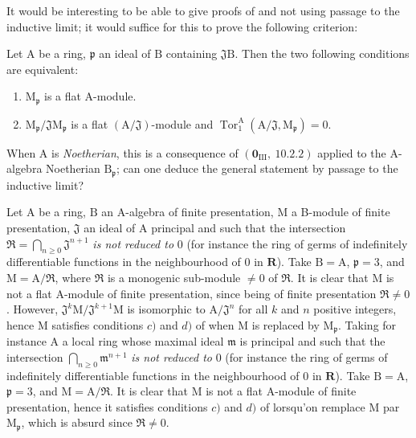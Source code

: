 \begin{remark}[11.3.12]
\label{IV.11.3.12}
It would be interesting to be able to give proofs of  and  not using passage to the inductive limit; it would suffice for this to prove the following criterion:

Let $\mathrm{A}$ be a ring, $\mathfrak{p}$ an ideal of $\mathrm{B}$ containing $\mathfrak{J}\mathrm{B}$. Then the two following conditions are equivalent:
\begin{enumerate}[label=\emph{\alph*)}]
  \item $\mathrm{M}_\mathfrak{p}$ is a flat A-module.
  \item $\mathrm{M}_\mathfrak{p}/\mathfrak{J}\mathrm{M}_\mathfrak{p}$ is a flat $(\mathrm{A}/\mathfrak{J})$-module and $\operatorname{Tor}_1^\mathrm{A}(\mathrm{A}/\mathfrak{J},\mathrm{M}_\mathfrak{p})=0$.
\end{enumerate}
When $\mathrm{A}$ is \emph{Noetherian}, this is a consequence of $(\mathbf{0}_{\mathrm{III}},~10.2.2)$ applied to the A-algebra Noetherian $\mathrm{B}_\mathfrak{p}$; can one deduce the general statement by passage to the inductive limit?

Let $\mathrm{A}$ be a ring, $\mathrm{B}$ an A-algebra of finite presentation, $\mathrm{M}$ a B-module of finite presentation, $\mathfrak{J}$ an ideal of A principal and such that the intersection $\mathfrak{R}=\bigcap_{n\geqslant 0}\mathfrak{J}^{n+1}$ \emph{is not reduced to} $0$ (for instance the ring of germs of indefinitely differentiable functions in the neighbourhood of $0$ in $\mathbf{R}$). Take $\mathrm{B}=\mathrm{A}$, $\mathfrak{p}=3$, and $\mathrm{M}=\mathrm{A}/\mathfrak{R}$, where $\mathfrak{R}$ is a monogenic sub-module $\neq 0$ of $\mathfrak{R}$. It is clear that $\mathrm{M}$ is not a flat A-module of finite presentation, since being of finite presentation $\mathfrak{R}\neq 0$. However, $\mathfrak{J}^k\mathrm{M}/\mathfrak{J}^{k+1}\mathrm{M}$ is isomorphic to $\mathrm{A}/\mathfrak{J}^n$ for all $k$ and $n$ positive integers, hence $\mathrm{M}$ satisfies conditions $c)$ and $d)$ of  when $\mathrm{M}$ is replaced by $\mathrm{M}_\mathfrak{p}$. Taking for instance $\mathrm{A}$ a local ring whose maximal ideal $\mathfrak{m}$ is principal and such that the intersection $\bigcap_{n\geqslant 0}\mathfrak{m}^{n+1}$ \emph{is not reduced to} $0$ (for instance the ring of germs of indefinitely differentiable functions in the neighbourhood of $0$ in $\mathbf{R}$). Take $\mathrm{B}=\mathrm{A}$, $\mathfrak{p}=3$, and $\mathrm{M}=\mathrm{A}/\mathfrak{R}$. It is clear that $\mathrm{M}$ is not a flat A-module of finite presentation, hence it satisfies conditions $c)$ and $d)$ of  lorsqu'on remplace $\mathrm{M}$ par $\mathrm{M}_\mathfrak{p}$, which is absurd since $\mathfrak{R}\neq 0$.
\end{remark}

